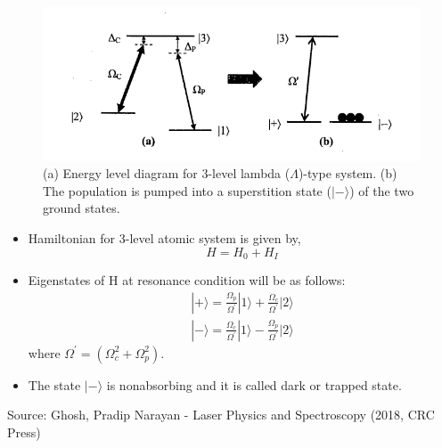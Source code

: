 \documentclass[9pt,aspectratio94]{beamer}
\begin{document}
\begin{frame}
\begin{figure}
\begin{center}
\includegraphics[scale=0.4]{CPT}
\caption{(a) Energy level diagram for 3-level
lambda ($ \Lambda $)-type system. (b) The population is pumped into a superstition state ($ | -\rangle $) of the two ground states. }
\end{center}
\end{figure}
\begin{itemize}
    \item Hamiltonian for 3-level atomic system is given by,
  \begin{equation*}
    H=H_{0}+H_{I} 
\end{equation*}
\item Eigenstates of H at resonance condition will be as follows:
\begin{eqnarray*}
 |+\rangle = \frac{\Omega_{p}}{\Omega^{'}} |1\rangle + \frac{\Omega_{c}}{\Omega^{'}} |2\rangle  \\
  |-\rangle = \frac{\Omega_{c}}{\Omega^{'}} |1\rangle - \frac{\Omega_{p}}{\Omega^{'}} |2\rangle
\end{eqnarray*}
where $ \Omega^{'} = (\Omega^{2}_{c} + \Omega^{2}_{p})$.
\item The state $|-\rangle$ is nonabsorbing and it is called dark or trapped state.
\end{itemize}
\tiny{Source: Ghosh, Pradip Narayan - Laser Physics and Spectroscopy (2018, CRC Press)}
\end{frame}
\end{document}
